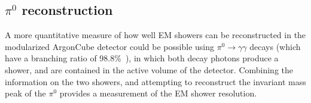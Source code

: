 
\subsection{$\pi^{0}$ reconstruction}
A more quantitative measure of how well EM showers can be reconstructed in the modularized ArgonCube detector could be possible using $\pi^{0} \rightarrow \gamma\gamma$ decays (which have a branching ratio of 98.8\%~\cite{pdg_2018}), in which both decay photons produce a shower, and are contained in the active volume of the detector. Combining the information on the two showers, and attempting to reconstruct the invariant mass peak of the $\pi^{0}$ provides a measurement of the EM shower resolution.

